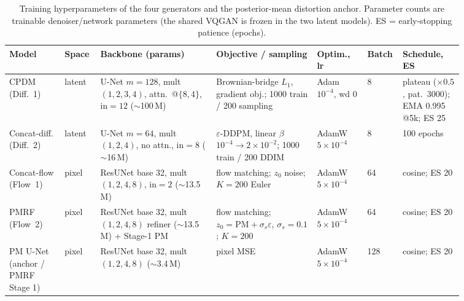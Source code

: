 \documentclass[11pt,a4paper]{article}
\begin{document}
\begin{table}[h]\centering\footnotesize
\setlength{\tabcolsep}{3.5pt}
\renewcommand{\arraystretch}{1.25}
\caption[Generator and anchor hyperparameters]{Training hyperparameters of the four generators and
the posterior-mean distortion anchor. Parameter counts are trainable denoiser/network parameters
(the shared VQGAN is frozen in the two latent models). ES = early-stopping patience (epochs).}
\label{tab:hp-gen}
\begin{tabular}{p{0.115\linewidth} p{0.05\linewidth} p{0.235\linewidth} p{0.20\linewidth} p{0.10\linewidth} p{0.035\linewidth} p{0.125\linewidth}}
\toprule
Model & Space & Backbone (params) & Objective / sampling & Optim., lr & Batch & Schedule, ES \\
\midrule
CPDM (Diff.~1) & latent & U-Net $m{=}128$, mult $(1,2,3,4)$, attn.\ @$\{8,4\}$, in${=}12$ ($\sim$100\,M) & Brownian-bridge $L_1$, gradient obj.; 1000 train / 200 sampling & Adam $10^{-4}$, wd 0 & 8 & plateau ($\times0.5$, pat.\ 3000); EMA 0.995 @5k; ES 25 \\
Concat-diff. (Diff.~2) & latent & U-Net $m{=}64$, mult $(1,2,4)$, no attn., in${=}8$ ($\sim$16\,M) & $\varepsilon$-DDPM, linear $\beta$ $10^{-4}{\to}2{\times}10^{-2}$; 1000 train / 200 DDIM & AdamW $5{\times}10^{-4}$ & 8 & 100 epochs \\
Concat-flow (Flow~1) & pixel & ResUNet base 32, mult $(1,2,4,8)$, in${=}2$ ($\sim$13.5\,M) & flow matching; $z_0$ noise; $K{=}200$ Euler & AdamW $5{\times}10^{-4}$ & 64 & cosine; ES 20 \\
PMRF (Flow~2) & pixel & ResUNet base 32, mult $(1,2,4,8)$ refiner ($\sim$13.5\,M) + Stage-1 PM & flow matching; $z_0{=}\text{PM}{+}\sigma_s\varepsilon$, $\sigma_s{=}0.1$; $K{=}200$ & AdamW $5{\times}10^{-4}$ & 64 & cosine; ES 20 \\
PM U-Net (anchor / PMRF Stage 1) & pixel & ResUNet base 32, mult $(1,2,4,8)$ ($\sim$3.4\,M) & pixel MSE & AdamW $5{\times}10^{-4}$ & 128 & cosine; ES 20 \\
\bottomrule
\end{tabular}
\end{table}
\end{document}

